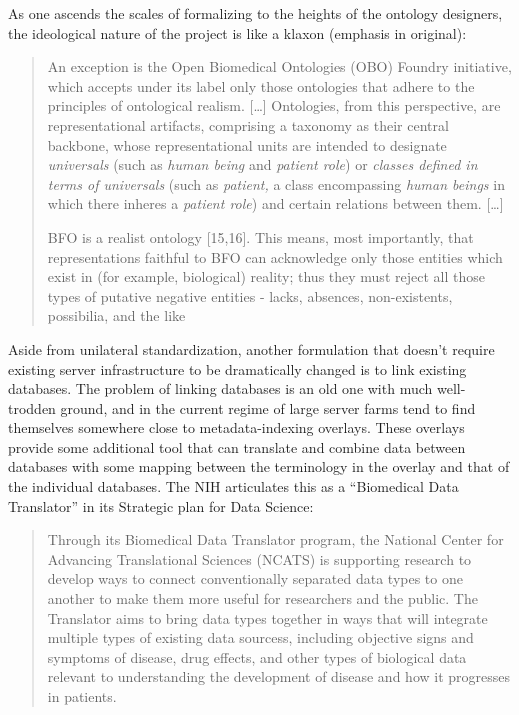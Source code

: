 \documentclass[notoc]{tufte-book}
\begin{document}
As one ascends the scales of formalizing to the heights of the ontology
designers, the ideological nature of the project is like a klaxon
(emphasis in original):

\begin{quote}
An exception is the Open Biomedical Ontologies (OBO) Foundry initiative,
which accepts under its label only those ontologies that adhere to the
principles of ontological realism. {[}\ldots{]} Ontologies, from this
perspective, are representational artifacts, comprising a taxonomy as
their central backbone, whose representational units are intended to
designate \emph{universals} (such as \emph{human being} and
\emph{patient role}) or \emph{classes defined in terms of universals}
(such as \emph{patient,} a class encompassing \emph{human beings} in
which there inheres a \emph{patient role}) and certain relations between
them. {[}\ldots{]}

BFO is a realist ontology {[}15,16{]}. This means, most importantly,
that representations faithful to BFO can acknowledge only those entities
which exist in (for example, biological) reality; thus they must reject
all those types of putative negative entities - lacks, absences,
non-existents, possibilia, and the like \citep{ceustersFoundationsRealistOntology2010} 
\end{quote}

Aside from unilateral standardization, another formulation that doesn't
require existing server infrastructure to be dramatically changed is to
link existing databases. The problem of linking databases is an old one
with much well-trodden ground, and in the current regime of large server
farms tend to find themselves somewhere close to metadata-indexing
overlays. These overlays provide some additional tool that can translate
and combine data between databases with some mapping between the
terminology in the overlay and that of the individual databases. The NIH
articulates this as a ``Biomedical Data Translator'' in its Strategic
plan for Data Science:

\begin{quote}
Through its Biomedical Data Translator program, the National Center for
Advancing Translational Sciences (NCATS) is supporting research to
develop ways to connect conventionally separated data types to one
another to make them more useful for researchers and the public. The
Translator aims to bring data types together in ways that will integrate
multiple types of existing data sourcess, including objective signs and
symptoms of disease, drug effects, and other types of biological data
relevant to understanding the development of disease and how it
progresses in patients. \citep{NIHStrategicPlan2018} 
\end{quote}
\end{document}
